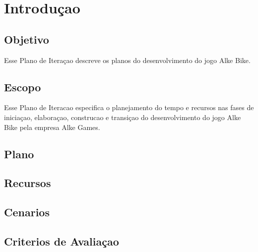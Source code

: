 \section{Introduçao} 
\subsection{Objetivo}

Esse Plano de Iteraçao descreve os planos do desenvolvimento do jogo Alke Bike.

\subsection{Escopo}

Esse Plano de Iteracao especifica o planejamento do tempo e recursos nas fases de iniciaçao, elaboraçao, construcao e transiçao do desenvolvimento do jogo Alke Bike pela empresa Alke Games.

\subsection{Plano}

\subsection{Recursos}

\subsection{Cenarios}

\subsection{Criterios de Avaliaçao}